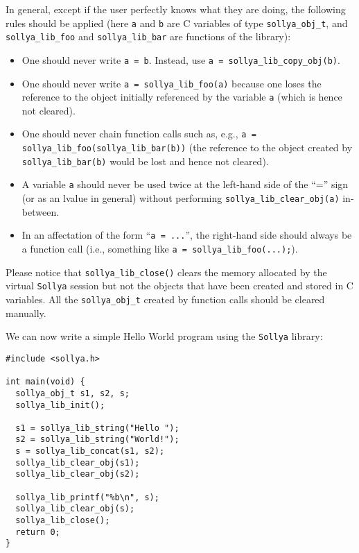 \documentclass[a4paper]{article}
\newcommand{\sollya}{\texttt{Sollya}\xspace}
\begin{document}
In general, except if the user perfectly knows what they are doing, the following rules should be applied (here \texttt{a} and \texttt{b} are C variables of type \texttt{sollya\_obj\_t}, and \texttt{sollya\_lib\_foo} and \texttt{sollya\_lib\_bar} are functions of the library):
\begin{itemize}
\item One should never write \texttt{a = b}. Instead, use \texttt{a = sollya\_lib\_copy\_obj(b)}.
\item One should never write \texttt{a = sollya\_lib\_foo(a)} because one loses the reference to the object initially referenced by the variable \texttt{a} (which is hence not cleared).
\item One should never chain function calls such as, e.g., \texttt{a = sollya\_lib\_foo(sollya\_lib\_bar(b))} (the reference to the object created by \texttt{sollya\_lib\_bar(b)} would be lost and hence not cleared).
\item A variable \texttt{a} should never be used twice at the left-hand side of the ``='' sign (or as an lvalue in general) without performing \texttt{sollya\_lib\_clear\_obj(a)} in-between.
\item In an affectation of the form ``\texttt{a = ...}'', the right-hand side should always be a function call (i.e., something like \texttt{a = sollya\_lib\_foo(...);}).
\end{itemize}

Please notice that \texttt{sollya\_lib\_close()} clears the memory allocated by the virtual \sollya session but not the objects that have been created and stored in C variables. All the \texttt{sollya\_obj\_t} created by function calls should be cleared manually.

We can now write a simple Hello World program using the \sollya library:
\begin{center}\begin{minipage}{15cm}\begin{Verbatim}[frame=single]
#include <sollya.h>

int main(void) {
  sollya_obj_t s1, s2, s;
  sollya_lib_init();

  s1 = sollya_lib_string("Hello ");
  s2 = sollya_lib_string("World!");
  s = sollya_lib_concat(s1, s2);
  sollya_lib_clear_obj(s1);
  sollya_lib_clear_obj(s2);

  sollya_lib_printf("%b\n", s);
  sollya_lib_clear_obj(s);
  sollya_lib_close();
  return 0;
}
\end{Verbatim}
\end{minipage}\end{center}
\end{document}
